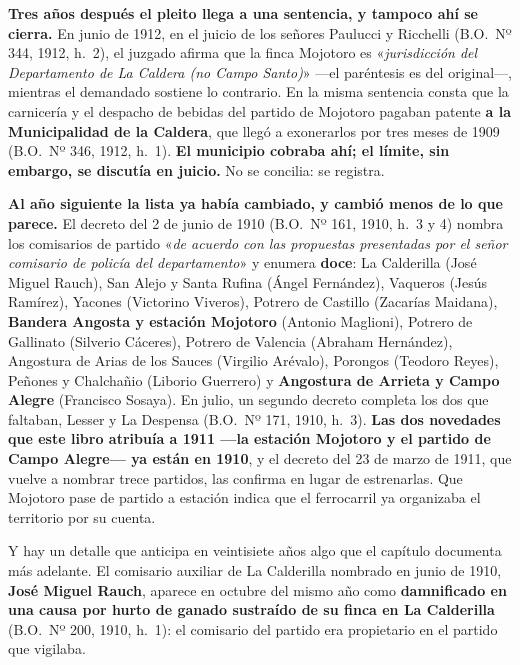 \textbf{Tres años después el pleito llega a una sentencia, y tampoco ahí se cierra.} En junio de
1912, en el juicio de los señores Paulucci y Ricchelli (B.O.\ Nº 344, 1912, h.\ 2), el juzgado afirma que la finca Mojotoro
es «\textit{jurisdicción del Departamento de La Caldera (no Campo Santo)}» ---el paréntesis es
del original---, mientras el demandado sostiene lo contrario. En la misma sentencia consta que
la carnicería y el despacho de bebidas del partido de Mojotoro pagaban patente \textbf{a la
Municipalidad de la Caldera}, que llegó a exonerarlos por tres meses de 1909 (B.O.\ Nº 346, 1912, h.\ 1). \textbf{El
municipio cobraba ahí; el límite, sin embargo, se discutía en juicio.} No se concilia: se
registra.

\textbf{Al año siguiente la lista ya había cambiado, y cambió menos de lo que parece.} El
decreto del 2 de junio de 1910 (B.O.\ Nº 161, 1910, h.\ 3 y 4) nombra los comisarios de partido «\textit{de acuerdo con las
propuestas presentadas por el señor comisario de policía del departamento}» y enumera
\textbf{doce}: La Calderilla (José Miguel Rauch), San Alejo y Santa Rufina (Ángel
Fernández), Vaqueros (Jesús Ramírez), Yacones (Victorino Viveros),
Potrero de Castillo (Zacarías Maidana), \textbf{Bandera Angosta y estación Mojotoro} (Antonio
Maglioni), Potrero de Gallinato (Silverio Cáceres), Potrero de Valencia (Abraham Hernández),
Angostura de Arias de los Sauces (Virgilio Arévalo), Porongos (Teodoro Reyes), Peñones y
Chalchañio (Liborio Guerrero) y \textbf{Angostura de Arrieta y Campo
Alegre} (Francisco Sosaya). En julio, un segundo decreto completa los dos que faltaban, Lesser
y La Despensa (B.O.\ Nº 171, 1910, h.\ 3). \textbf{Las dos novedades que este libro atribuía a 1911 ---la estación Mojotoro
y el partido de Campo Alegre--- ya están en 1910}, y el decreto del 23 de marzo de 1911, que
vuelve a nombrar trece partidos, las confirma en lugar de estrenarlas. Que Mojotoro pase de
partido a estación indica que el ferrocarril ya organizaba el territorio por su cuenta.

Y hay un detalle que anticipa en veintisiete años algo que el capítulo documenta más adelante.
El comisario auxiliar de La Calderilla nombrado en junio de 1910, \textbf{José Miguel Rauch},
aparece en octubre del mismo año como \textbf{damnificado en una causa por hurto de ganado
sustraído de su finca en La Calderilla} (B.O.\ Nº 200, 1910, h.\ 1): el comisario del partido era propietario en el partido
que vigilaba.

